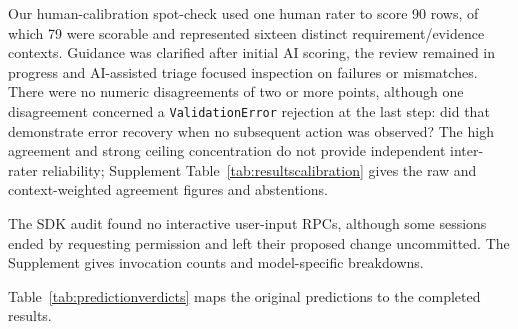 \FloatBarrier
Our human-calibration spot-check used one human rater to score 90 rows, of which 79 were scorable and represented sixteen distinct
requirement/evidence contexts. Guidance was clarified after initial AI
scoring, the review remained in progress and AI-assisted triage focused
inspection on failures or mismatches. There were no numeric disagreements of two or more points, although one disagreement concerned a
\texttt{ValidationError} rejection at the last step: did that demonstrate
error recovery when no subsequent action was observed?
The high agreement and strong ceiling
concentration do not provide independent inter-rater reliability; Supplement Table~\ref{tab:resultscalibration} gives the raw and context-weighted
agreement figures and abstentions.

The SDK audit found no interactive user-input RPCs, although some sessions
ended by requesting permission and left their proposed change uncommitted.
The Supplement gives invocation counts and model-specific breakdowns.

Table~\ref{tab:predictionverdicts} maps the original predictions to the completed results.

